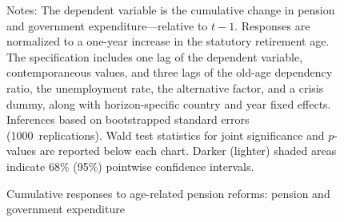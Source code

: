 \documentclass[11pt,english,a4paper, twoside, authoryear]{article}
\begin{document}
\begin{figure}[h]
\vspace{-.1cm}
\caption{Cumulative responses to age-related pension reforms: pension and government expenditure}
\label{fig:fig_pension_exp_age}
\vspace{.1cm}
\begin{minipage}{\linewidth}
\scriptsize
Notes: The dependent variable is the cumulative change in pension and government expenditure---relative to $t{-}1$. Responses are normalized to a one-year increase in the statutory retirement age. The specification includes one lag of the dependent variable, contemporaneous values, and three lags of the old-age dependency ratio, the unemployment rate, the alternative factor, and a crisis dummy, along with horizon-specific country and year fixed effects. Inferences based on bootstrapped standard errors (1000~replications). Wald test statistics for joint significance and $p$-values are reported below each chart. Darker (lighter) shaded areas indicate 68\% (95\%) pointwise confidence intervals.
\end{minipage}
\end{figure}


\clearpage
\end{document}
